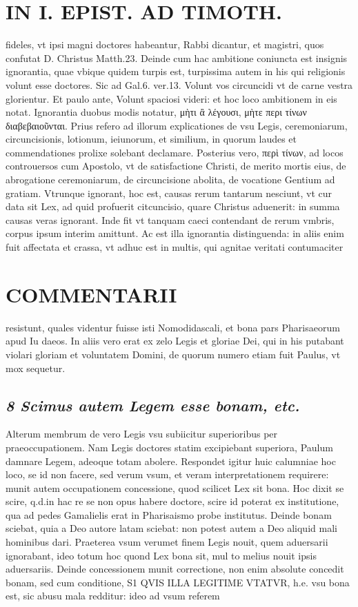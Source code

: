 \documentclass{article}
\begin{document}
\begin{pages}
\section*{IN I. EPIST. AD TIMOTH. }
\marginpar{[ p.25 ]}\pstart fideles, vt ipsi magni doctores habeantur, Rabbi dicantur, et magistri, quos confutat D. Christus Matth.23. Deinde cum hac ambitione coniuncta est insignis ignorantia, quae vbique quidem turpis est, turpissima autem in his qui religionis volunt esse doctores. Sic ad Gal.6. ver.13. Volunt vos circuncidi vt de carne vestra glorientur. Et paulo ante, Volunt spaciosi videri: et hoc loco ambitionem in eis notat. Ignorantia duobus modis notatur, μὴτι ἂ λέγουσι, μὴτε περι τίνων διαβεβαιοῦνται. Prius refero ad illorum explicationes de vsu Legis, ceremoniarum, circuncisionis, lotionum, ieiunorum, et similium, in quorum laudes et commendationes prolixe solebant declamare. Posterius vero, περὶ τίνων, ad locos controuersos cum Apostolo, vt de satisfactione Christi, de merito mortis eius, de abrogatione ceremoniarum, de circuncisione abolita, de vocatione Gentium ad gratiam. Vtrunque ignorant, hoc est, causas rerum tantarum nesciunt, vt cur data sit Lex, ad quid profuerit citcuncisio, quare Christus aduenerit: in summa causas veras ignorant.  \pend\pstart Inde fit vt tanquam caeci contendant de rerum vmbris, corpus ipsum interim amittunt. Ac est illa ignorantia distinguenda: in aliis enim fuit affectata et crassa, vt adhuc est in multis, qui agnitae veritati contumaciter  \pend
\section*{COMMENTARII }
\marginpar{[ p.26 ]}\pstart resistunt, quales videntur fuisse isti Nomodidascali, et bona pars Pharisaeorum apud Iu daeos. In aliis vero erat ex zelo Legis et gloriae Dei, qui in his putabant violari gloriam et voluntatem Domini, de quorum numero etiam fuit Paulus, vt mox sequetur.  \pend
{}
{}
\subsection*{\textit{8 Scimus autem Legem esse bonam, etc. }}\pstart Alterum membrum de vero Legis vsu subiicitur superioribus per praeoccupationem. Nam Legis doctores statim excipiebant superiora, Paulum damnare Legem, adeoque totam abolere. Respondet igitur huic calumniae hoc loco, se id non facere, sed verum vsum, et veram interpretationem requirere: munit autem occupationem concessione, quod scilicet Lex sit bona. Hoc dixit se scire, q.d.in hac re se non opus habere doctore, scire id poterat ex institutione, qua ad pedes Gamalielis erat in Pharisaismo probe institutus. Deinde bonam sciebat, quia a Deo autore latam sciebat: non potest autem a Deo aliquid mali hominibus dari. Praeterea vsum verumet finem Legis nouit, quem aduersarii ignorabant, ideo totum hoc quond Lex bona sit, mul to melius nouit ipsis aduersariis. Deinde concessionem munit correctione, non enim absolute concedit bonam, sed cum conditione, S1 QVIS ILLA LEGITIME VTATVR, h.e. vsu bona est, sic abusu mala redditur: ideo ad vsum referem\pend

\end{pages}
\end{document}

